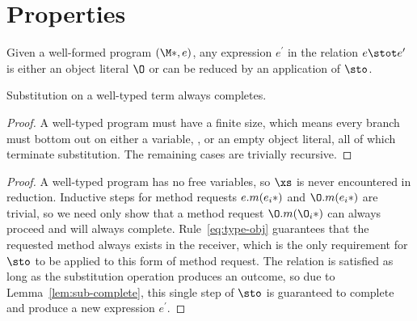 \section{Properties}

\begin{theorem}[Progress]\label{th:progress}
  Given a well-formed program $(\*\M*, e)$, any expression $e^\prime$ in the
  relation $e \stot e^\prime$ is either an object literal $\O$ or can be reduced
  by an application of $\sto$.

  \begin{lemma}\label{lem:sub-complete}
    Substitution on a well-typed term always completes.

    \begin{proof}
      A well-typed program must have a finite size, which means every branch
      must bottom out on either a variable, \self, or an empty object literal,
      all of which terminate substitution.  The remaining cases are trivially
      recursive.
    \end{proof}
  \end{lemma}

  \begin{proof}
    A well-typed program has no free variables, so $\xs$ is never encountered in
    reduction.  Inductive steps for method requests $e.m(\*e_i*)$ and
    $\O.m(\*e_i*)$ are trivial, so we need only show that a method request
    $\O.m(\*\O_i*)$ can always proceed and will always complete.
    Rule~\ref{eq:type-obj} guarantees that the requested method always exists in
    the receiver, which is the only requirement for $\sto$ to be applied to this
    form of method request.  The relation is satisfied as long as the
    substitution operation produces an outcome, so due to
    Lemma~\ref{lem:sub-complete}, this single step of $\sto$ is guaranteed to
    complete and produce a new expression $e^\prime$.
  \end{proof}
\end{theorem}

